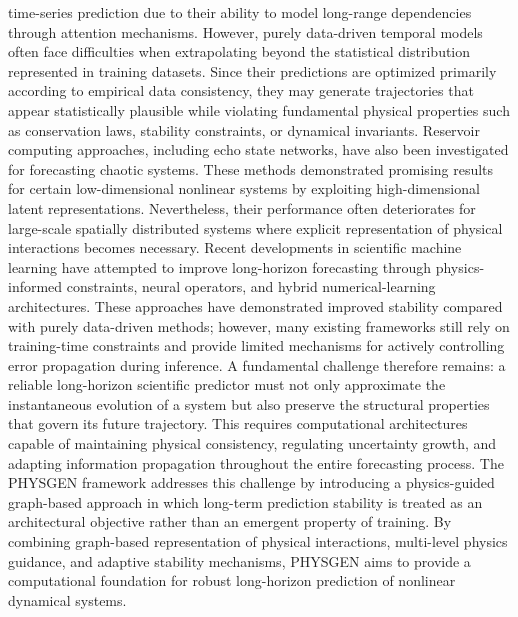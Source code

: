 time-series prediction due to their ability to model long-range dependencies through attention mechanisms. However, purely data-driven temporal models often face difficulties when extrapolating beyond the statistical distribution represented in training datasets. Since their predictions are optimized primarily according to empirical data consistency, they may generate trajectories that appear statistically plausible while violating fundamental physical properties such as conservation laws, stability constraints, or dynamical invariants. Reservoir computing approaches, including echo state networks, have also been investigated for forecasting chaotic systems. These methods demonstrated promising results for certain low-dimensional nonlinear systems by exploiting high-dimensional latent representations. Nevertheless, their performance often deteriorates for large-scale spatially distributed systems where explicit representation of physical interactions becomes necessary. Recent developments in scientific machine learning have attempted to improve long-horizon forecasting through physics-informed constraints, neural operators, and hybrid numerical-learning architectures. These approaches have demonstrated improved stability compared with purely data-driven methods; however, many existing frameworks still rely on training-time constraints and provide limited mechanisms for actively controlling error propagation during inference. A fundamental challenge therefore remains: a reliable long-horizon scientific predictor must not only approximate the instantaneous evolution of a system but also preserve the structural properties that govern its future trajectory. This requires computational architectures capable of maintaining physical consistency, regulating uncertainty growth, and adapting information propagation throughout the entire forecasting process. The PHYSGEN framework addresses this challenge by introducing a physics-guided graph-based approach in which long-term prediction stability is treated as an architectural objective rather than an emergent property of training. By combining graph-based representation of physical interactions, multi-level physics guidance, and adaptive stability mechanisms, PHYSGEN aims to provide a computational foundation for robust long-horizon prediction of nonlinear dynamical systems. \] 
